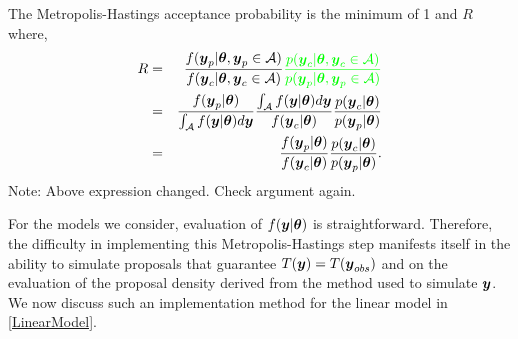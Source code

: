 \documentclass[11pt]{article}
\def\bth{\mbox{\boldmath $\theta$}}
\newcommand{\by}{\mbox{\boldmath $y$}}
\newcommand{\red}[1]{{\color{red}#1}}
\newcommand{\green}[1]{{\color{green}#1}}
\begin{document}
The Metropolis-Hastings acceptance probability  is the minimum of 1 and $R$ where,
\begin{eqnarray}
\label{MHRatio}
R & = & \frac{f(\by_p|\bth,\by_p \in \mathcal{A})}{f(\by_c|\bth,\by_c \in \mathcal{A})}  
                \green{\frac{p(\by_c|\bth, \by_c \in \mathcal{A})}{p(\by_p|\bth,\by_p \in \mathcal{A})}} \\
  & = & \frac{f(\by_p | \bth)}{\int_\mathcal{A} f(\by | \bth) d\by} \frac{\int_\mathcal{A} f(\by | \bth) d\by}{f(\by_c | \bth)} \frac{p(\by_c | \bth)}{p(\by_p | \bth)} \\
 & = & \frac{f(\by_p|\bth)}{f(\by_c|\bth)} \frac{p(\by_c|\bth)}{p(\by_p|\bth)} .  
\end{eqnarray}
\green{Note:  Above expression changed.  Check argument again.}

For the models we consider, evaluation of $f(\by | \bth)$ is straightforward.  Therefore, the difficulty in implementing this Metropolis-Hastings step manifests  itself in the ability to simulate proposals that guarantee $T(\by) = T(\by_{obs})$ and on the evaluation of the proposal density derived from the method used to simulate $\by$. We now discuss such an implementation method for the linear model in \eqref{LinearModel}.
\end{document}
